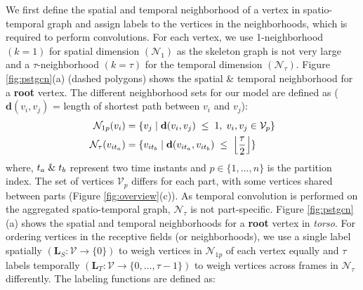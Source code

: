 \documentclass{bmvc2k}
\begin{document}
We first define the spatial and temporal neighborhood of a vertex in spatio-temporal graph and assign labels to the vertices in the neighborhoods, which is required to perform convolutions. For each vertex, we use 1-neighborhood $(k = 1)$ for spatial dimension $(\mathcal{N}_1)$ as the skeleton graph is not very large and a $\tau$-neighborhood $(k = \tau)$ for the temporal dimension $(\mathcal{N}_{\tau})$. Figure \ref{fig:pstgcn}(a) (dashed polygons) shows the spatial \& temporal neighborhood for a \textbf{root} vertex. The different neighborhood sets for our model are defined as ($\mathbf{d}(v_i, v_j)$ = length of shortest path between $v_i$ and $v_j$):
\begingroup
\small
\begin{align}
    \mathcal{N}_{1p}(v_i) &= \{v_j \hspace{0.1cm} | \hspace{0.1cm} \mathbf{d}(v_i, v_j) \hspace{0.1cm} \leq \hspace{0.1cm} 1, \hspace{0.1cm} v_i, v_j \in \mathcal{V}_p\} \label{eq:sneigh} \\
    \mathcal{N}_{\tau}(v_{i{t_a}}) &= \{v_{i{t_b}} \hspace{0.1cm} | \hspace{0.1cm} \mathbf{d}(v_{i{t_a}}, v_{i{t_b}}) \hspace{0.1cm} \leq \hspace{0.1cm} \left\lfloor \frac{\tau}{2} \right\rfloor\} \label{eq:tneigh}
\end{align}
\endgroup
where, $t_a \hspace{0.1cm} \& \hspace{0.1cm} t_b$ represent two time instants and $p \in \{1,\ldots,n\}$ is the partition index. The set of vertices $\mathcal{V}_p$ differs for each part, with some vertices shared between parts (Figure \ref{fig:overview}(c)). As temporal convolution is performed on the aggregated spatio-temporal graph, $\mathcal{N}_{\tau}$ is not part-specific. Figure \ref{fig:pstgcn}(a) shows the spatial and temporal neighborhoods for a \textbf{root} vertex in \textit{torso}. For ordering vertices in the receptive fields (or neighborhoods), we use a single label spatially $(\mathbf{L}_S: \mathcal{V} \rightarrow \{0\})$ to weigh vertices in $\mathcal{N}_{1p}$ of each vertex equally and $\tau$ labels temporally $(\mathbf{L}_T: \mathcal{V} \rightarrow \{0,\ldots,\tau-1\})$ to weigh vertices across frames in $\mathcal{N}_{\tau}$ differently. The labeling functions are defined as:
\begingroup
\end{document}
